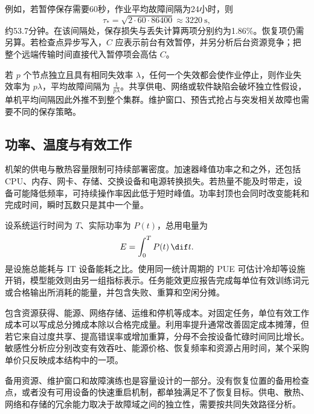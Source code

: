\documentclass[../textbook.tex]{subfiles}
\begin{document}
例如，若暂停保存需要60秒，作业平均故障间隔为24小时，则
\begin{equation}
 \tau_*=\sqrt{2\cdot60\cdot86400}\approx3220\ \mathrm{s},
\end{equation}
约53.7分钟。在该间隔处，保存损失与丢失计算两项分别约为1.86\%。恢复项仍需另算。若检查点异步写入，$C$ 应表示前台有效暂停，并另分析后台资源竞争；把整个远端传输时间直接代入暂停项会高估 $C$。

若 $p$ 个节点独立且具有相同失效率 $\lambda$，任何一个失效都会使作业停止，则作业失效率为 $p\lambda$，平均故障间隔为 $\frac{1}{p\lambda}$。共享供电、网络或软件缺陷会破坏独立性假设，单机平均间隔因此外推不到整个集群。维护窗口、预告式抢占与突发相关故障也需要不同的保存策略。

\subsection{功率、温度与有效工作}
机架的供电与散热容量限制可持续部署密度。加速器峰值功率之和之外，还包括 CPU、内存、网卡、存储、交换设备和电源转换损失。若热量不能及时带走，设备可能降低频率，可持续操作率因此低于短时峰值。功率封顶也会同时改变能耗和完成时间，瞬时瓦数只是其中一个量。

设系统运行时间为 $T$、实际功率为 $P(t)$，总用电量为
\begin{equation}
 E=\int_0^T P(t)\,\dif t.
\end{equation}
是设施总能耗与 IT 设备能耗之比。\cite{doe2024datacenter}使用同一统计周期的 PUE 可估计冷却等设施开销，模型能效则由另一组指标表示。任务能效更应报告完成每单位有效训练词元或合格输出所消耗的能量，并包含失败、重算和空闲分摊。

包含资源获得、能源、网络存储、运维和停机等成本。对固定任务，单位有效工作成本可以写成总分摊成本除以合格完成量。利用率提升通常改善固定成本摊薄，但若它来自过度共享、提高错误率或增加重算，分母不会按设备忙碌时间同比增长。敏感性分析应分别改变有效吞吐、能源价格、恢复频率和资源占用时间，某个采购单价只反映成本结构中的一项。

备用资源、维护窗口和故障演练也是容量设计的一部分。没有恢复位置的备用检查点，或者没有可用设备的快速重启机制，都单独满足不了恢复目标。供电、散热、网络和存储的冗余能力取决于故障域之间的独立性，需要按共同失效路径分析。
\end{document}
